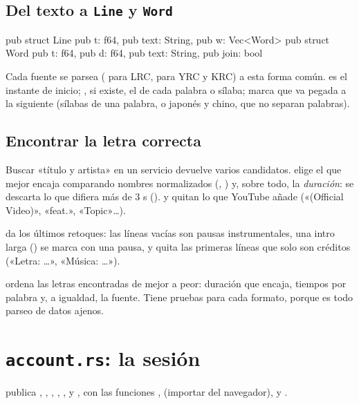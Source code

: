 \subsection{Del texto a \texttt{Line} y \texttt{Word}}

\begin{rust}
pub struct Line { pub t: f64, pub text: String, pub w: Vec<Word> }
pub struct Word { pub t: f64, pub d: f64, pub text: String, pub join: bool }
\end{rust}

Cada fuente se parsea ( para LRC,  para YRC y KRC) a esta forma
común.  es el instante de inicio; , si existe, el de cada palabra o sílaba;
 marca que va pegada a la siguiente (sílabas de una palabra, o japonés y chino, que
no separan palabras).

\subsection{Encontrar la letra correcta}

Buscar «título y artista» en un servicio devuelve varios candidatos.  elige el que
mejor encaja comparando nombres normalizados (, ) y, sobre todo, la
\emph{duración}: se descarta lo que difiera más de 3 s ().  y
 quitan lo que YouTube añade («(Official Video)», «feat.», «Topic»\dots).

 da los últimos retoques: las líneas vacías son pausas instrumentales, una intro
larga () se marca con una pausa, y  quita las primeras
líneas que solo son créditos («Letra: \dots», «Música: \dots»).

 ordena las letras encontradas de mejor a peor: duración que encaja, tiempos por
palabra y, a igualdad, la fuente. Tiene pruebas para cada formato, porque es todo parseo de datos
ajenos.

\section{\texttt{account.rs}: la sesión}

 publica , , , , ,
 y , con las funciones ,
 (importar del navegador),  y .

